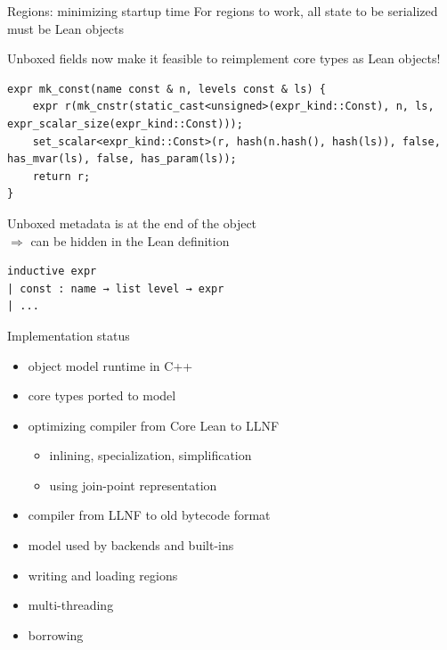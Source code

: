 \documentclass[t]{beamer}
\begin{document}
\begin{frame}{Regions: minimizing startup time}
  For regions to work, all state to be serialized must be Lean objects

  \pause
  \bigskip

  Unboxed fields now make it feasible to reimplement core types as Lean objects!


\begin{verbatim}
expr mk_const(name const & n, levels const & ls) {
    expr r(mk_cnstr(static_cast<unsigned>(expr_kind::Const), n, ls, expr_scalar_size(expr_kind::Const)));
    set_scalar<expr_kind::Const>(r, hash(n.hash(), hash(ls)), false, has_mvar(ls), false, has_param(ls));
    return r;
}
\end{verbatim}

  \pause

  Unboxed metadata is at the end of the object\\
  $\Longrightarrow$ can be hidden in the Lean definition

\begin{verbatim}
inductive expr
| const : name → list level → expr
| ...
\end{verbatim}
\end{frame}

\begin{frame}{Implementation status}
  \begin{itemize}
  \item object model runtime in C++
  \item core types ported to model
  \item optimizing compiler from Core Lean to LLNF
    \begin{itemize}
    \item inlining, specialization, simplification
    \item using join-point representation
    \end{itemize}
  \item compiler from LLNF to old bytecode format

    \color{gray}

  \item model used by backends and built-ins
  \item writing and loading regions
  \item multi-threading
  \item borrowing
  \end{itemize}
\end{frame}
\end{document}
